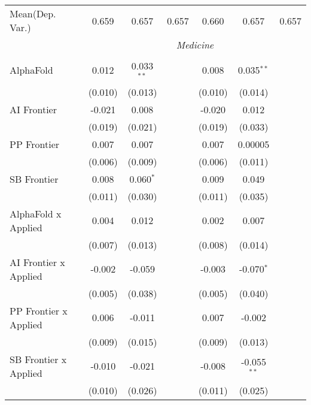 \begin{tabular}{lcccccc}
Mean(Dep. Var.) & 0.659 & 0.657 & 0.657 & 0.660 & 0.657 & 0.657 \\
 & \multicolumn{6}{c}{\textit{Medicine}} \\ \\
   AlphaFold                      & 0.012   & 0.033$^{**}$ &                & 0.008   & 0.035$^{**}$  &   \\   
                                  & (0.010) & (0.013)      &                & (0.010) & (0.014)       &   \\   
   AI Frontier                    & -0.021  & 0.008        &                & -0.020  & 0.012         &   \\   
                                  & (0.019) & (0.021)      &                & (0.019) & (0.033)       &   \\   
   PP Frontier                    & 0.007   & 0.007        &                & 0.007   & 0.00005       &   \\   
                                  & (0.006) & (0.009)      &                & (0.006) & (0.011)       &   \\   
   SB Frontier                    & 0.008   & 0.060$^{*}$  &                & 0.009   & 0.049         &   \\   
                                  & (0.011) & (0.030)      &                & (0.011) & (0.035)       &   \\   
   AlphaFold x Applied            & 0.004   & 0.012        &                & 0.002   & 0.007         &   \\   
                                  & (0.007) & (0.013)      &                & (0.008) & (0.014)       &   \\   
   AI Frontier x Applied          & -0.002  & -0.059       &                & -0.003  & -0.070$^{*}$  &   \\   
                                  & (0.005) & (0.038)      &                & (0.005) & (0.040)       &   \\   
   PP Frontier x Applied          & 0.006   & -0.011       &                & 0.007   & -0.002        &   \\   
                                  & (0.009) & (0.015)      &                & (0.009) & (0.013)       &   \\   
   SB Frontier x Applied          & -0.010  & -0.021       &                & -0.008  & -0.055$^{**}$ &   \\   
                                  & (0.010) & (0.026)      &                & (0.011) & (0.025)       &   \\   

\end{tabular}
